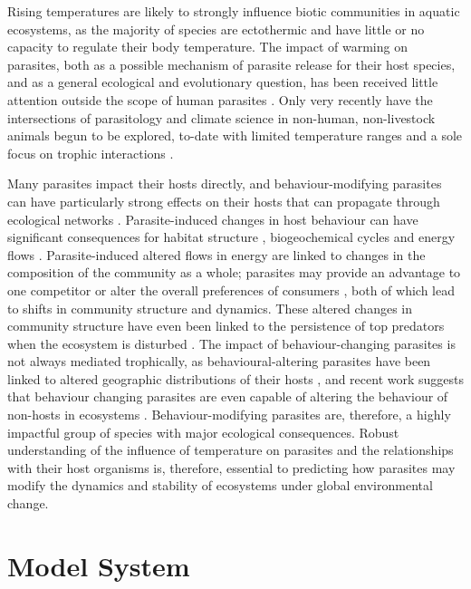 Rising temperatures are likely to strongly influence biotic communities in aquatic ecosystems, as the majority of species are ectothermic and have little or no capacity to regulate their body temperature. The impact of warming on parasites, both as a possible mechanism of parasite release for their host species, and as a general ecological and evolutionary question, has been received little attention outside the scope of human parasites \citep{scott1984,gonzalez2010}. Only very recently have the intersections of parasitology and climate science in non-human, non-livestock animals begun to be explored, to-date with limited temperature ranges \citep{labaude2017} and a sole focus on trophic interactions \citep{laverty2017}. 

Many parasites impact their hosts directly, and behaviour-modifying parasites can have particularly strong effects on their hosts that can propagate through ecological networks \citep{labaude2015host}. Parasite-induced changes in host behaviour can have significant consequences for habitat structure \citep{mouritsen2005}, biogeochemical cycles \citep{vannatta2018} and energy flows \citep{sato2011}. Parasite-induced altered flows in energy are linked to changes in the composition of the community as a whole; parasites may provide an advantage to one competitor \citep{hatcher2014} or alter the overall preferences of consumers \citep{bernot2007,sato2011,bunke2015}, both of which lead to shifts in community structure and dynamics. These altered changes in community structure have even been linked to the persistence of top predators when the ecosystem is disturbed \citep{lefevre2009}. The impact of behaviour-changing parasites is not always mediated trophically, as behavioural-altering parasites have been linked to altered geographic distributions of their hosts \citep{frick2015}, and recent work suggests that behaviour changing parasites are even capable of altering the behaviour of non-hosts in ecosystems \citep{demandt2018}. 
Behaviour-modifying parasites are, therefore, a highly impactful group of species with major ecological consequences. Robust understanding of the influence of temperature on parasites and the relationships with their host organisms is, therefore, essential to predicting how parasites may modify the dynamics and stability of ecosystems under global environmental change. 

\section{Model System}

